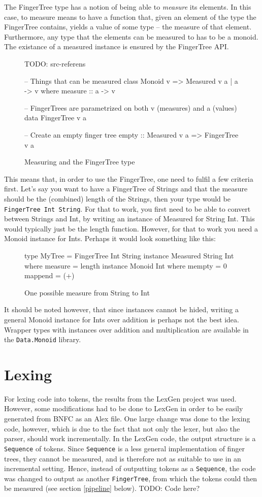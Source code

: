 \documentclass[a4paper,12pt,twosided]{report}
\begin{document}
The FingerTree type has a notion of being able to \textit{measure} its elements.
In this case, to measure means to have a function that, given an element of the
type the FingerTree contains, yields a value of some type -- the measure of that
element. Furthermore, any type that the elements can be measured to has to be a
monoid. The existance of a measured instance is ensured by the FingerTree API. 
\begin{figure}[H]
TODO: src-referens
\begin{code}
-- Things that can be measured
class Monoid v => Measured v a | a -> v where
    measure :: a -> v

-- FingerTrees are parametrized on both v (measures) and a (values)
data FingerTree v a

-- Create an empty finger tree
empty :: Measured v a => FingerTree v a
\end{code}
\caption{Measuring and the FingerTree type}
\end{figure}
This means that, in order to use the FingerTree, one need to fulfil a few
criteria first. Let's say you want to have a FingerTree of Strings and that the
measure should be the (combined) length of the Strings, then your type would be
\texttt{FingerTree Int String}. For that to work, you first need to be able to
convert between Strings and Int, by writing an instance of Measured for String
Int. This would typically just be the length function. However, for that to work
you need a Monoid instance for Ints. Perhaps it would look something like this:

\begin{figure}[H]
\begin{code}
type MyTree = FingerTree Int String
instance Measured String Int where
    measure = length
instance Monoid Int where
    mempty = 0
    mappend = (+)
\end{code}
\caption{One possible measure from String to Int}
\end{figure}
It should be noted however, that since instances cannot be hided, writing a
general Monoid instance for Ints over addition is perhaps not the best idea.
Wrapper types with instances over addition and multiplication are available in
the \texttt{Data.Monoid} library.

\section{Lexing}
For lexing code into tokens, the results from the LexGen project was used.
However, some modifications had to be done to LexGen in order to be easily
generated from BNFC as an Alex file. One large change was done to the lexing
code, however, which is due to the fact that not only the lexer, but also the
parser, should work incrementally. In the LexGen code, the output structure is a
\texttt{Sequence} of tokens. Since \texttt{Sequence} is a less general
implementation of finger trees, they cannot be measured, and is therefore not as
suitable to use in an incremental setting. Hence, instead of outputting tokens
as a \texttt{Sequence}, the code was changed to output as another
\texttt{FingerTree}, from which the tokens could then be measured (see section
\ref{pipeline} below).
TODO: Code here?
\end{document}
